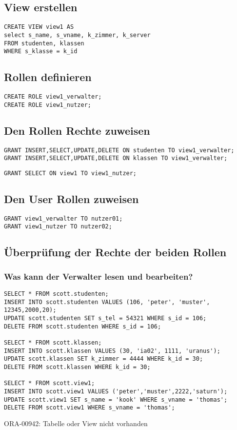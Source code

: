 \documentclass[10pt]{scrreprt}
\begin{document}
\subsection{View erstellen}
\begin{lstlisting}[style=sql]
CREATE VIEW view1 AS
select s_name, s_vname, k_zimmer, k_server
FROM studenten, klassen
WHERE s_klasse = k_id
\end{lstlisting}

\subsection{Rollen definieren}
\begin{lstlisting}[style=sql]
CREATE ROLE view1_verwalter;
CREATE ROLE view1_nutzer;
\end{lstlisting}

\subsection{Den Rollen Rechte zuweisen}
\begin{lstlisting}[style=sql]
GRANT INSERT,SELECT,UPDATE,DELETE ON studenten TO view1_verwalter;
GRANT INSERT,SELECT,UPDATE,DELETE ON klassen TO view1_verwalter;
\end{lstlisting}

\begin{lstlisting}[style=sql]
GRANT SELECT ON view1 TO view1_nutzer;
\end{lstlisting}

\subsection{Den User Rollen zuweisen}
\begin{lstlisting}[style=sql]
GRANT view1_verwalter TO nutzer01;
GRANT view1_nutzer TO nutzer02;
\end{lstlisting}

\subsection{Überprüfung der Rechte der beiden Rollen}
\subsubsection{Was kann der Verwalter lesen und bearbeiten?}
\begin{lstlisting}[style=sql]
SELECT * FROM scott.studenten;
INSERT INTO scott.studenten VALUES (106, 'peter', 'muster', 12345,2000,20);
UPDATE scott.studenten SET s_tel = 54321 WHERE s_id = 106;
DELETE FROM scott.studenten WHERE s_id = 106;

SELECT * FROM scott.klassen;
INSERT INTO scott.klassen VALUES (30, 'ia02', 1111, 'uranus');
UPDATE scott.klassen SET k_zimmer = 4444 WHERE k_id = 30;
DELETE FROM scott.klassen WHERE k_id = 30;

SELECT * FROM scott.view1;
INSERT INTO scott.view1 VALUES ('peter','muster',2222,'saturn');
UPDATE scott.view1 SET s_name = 'kook' WHERE s_vname = 'thomas';
DELETE FROM scott.view1 WHERE s_vname = 'thomas';
\end{lstlisting}
ORA-00942: Tabelle oder View nicht vorhanden
\end{document}

